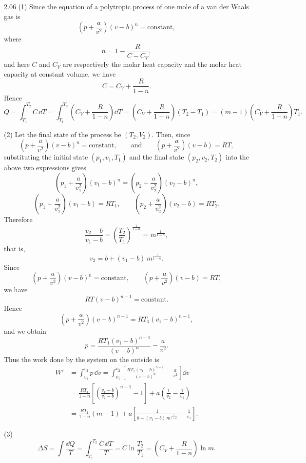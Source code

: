 \begin{solution}{2.06}
(1) Since the equation of a polytropic process of one mole of a van der Waals gas is
\[
\left(p+\frac{a}{v^2}\right)(v-b)^n=\text{constant},
\]
where
\[
n=1-\frac{R}{C-C_V},
\]
and here $C$ and $C_V$ are respectively the molar heat capacity and the molar heat capacity at constant volume, we have
\[
C=C_V+\frac{R}{1-n}.
\]
Hence
\[
Q=\int_{T_1}^{T_2}C\,\dd T=\int_{T_1}^{T_2}\left(C_V+\frac{R}{1-n}\right)\dd T
=\left(C_V+\frac{R}{1-n}\right)(T_2-T_1)
=(m-1)\left(C_V+\frac{R}{1-n}\right)T_1.
\]

(2) Let the final state of the process be $(T_2,V_2)$. Then, since
\[
\left(p+\frac{a}{v^2}\right)(v-b)^n=\text{constant},
\qquad\text{and}\qquad
\left(p+\frac{a}{v^2}\right)(v-b)=RT,
\]
substituting the initial state $(p_1,v_1,T_1)$ and the final state $(p_2,v_2,T_2)$ into the above two expressions gives
\[
\left(p_1+\frac{a}{v_1^2}\right)(v_1-b)^n=\left(p_2+\frac{a}{v_2^2}\right)(v_2-b)^n,
\]
\[
\left(p_1+\frac{a}{v_1^2}\right)(v_1-b)=RT_1,
\qquad
\left(p_2+\frac{a}{v_2^2}\right)(v_2-b)=RT_2.
\]
Therefore
\[
\frac{v_2-b}{v_1-b}=\left(\frac{T_2}{T_1}\right)^{\frac{1}{1-n}}=m^{\frac{1}{1-n}},
\]
that is,
\[
v_2=b+(v_1-b)\,m^{\frac{1}{1-n}}.
\]
Since
\[
\left(p+\frac{a}{v^2}\right)(v-b)^n=\text{constant},
\qquad
\left(p+\frac{a}{v^2}\right)(v-b)=RT,
\]
we have
\[
RT(v-b)^{n-1}=\text{constant}.
\]
Hence
\[
\left(p+\frac{a}{v^2}\right)(v-b)^{n-1}=RT_1(v_1-b)^{n-1},
\]
and we obtain
\[
p=\frac{RT_1(v_1-b)^{n-1}}{(v-b)^n}-\frac{a}{v^2}.
\]
Thus the work done by the system on the outside is
\[
\begin{aligned}
W'&=\int_{v_1}^{v_2}p\,\dd v
=\int_{v_1}^{v_2}\left[\frac{RT_1(v_1-b)^{n-1}}{(v-b)^n}-\frac{a}{v^2}\right]\dd v\\
&=\frac{RT_1}{1-n}\left[\left(\frac{v_1-b}{v_2-b}\right)^{n-1}-1\right]
+a\left(\frac{1}{v_2}-\frac{1}{v_1}\right)\\
&=\frac{RT_1}{1-n}(m-1)
+a\left[\frac{1}{b+(v_1-b)\,m^{\frac{1}{1-n}}}-\frac{1}{v_1}\right].
\end{aligned}
\]

(3)
\[
\Delta S=\int\frac{\dd Q}{T}=\int_{T_1}^{T_2}\frac{C\,\dd T}{T}=C\ln\frac{T_2}{T_1}
=\left(C_V+\frac{R}{1-n}\right)\ln m.
\]
\end{solution}

